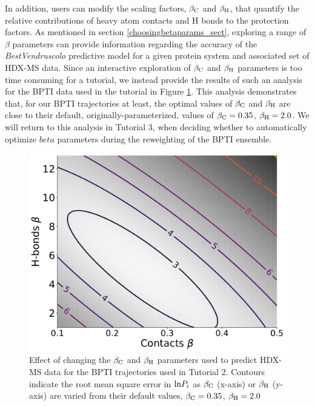 \documentclass[9pt,tutorial]{livecoms}
\begin{document}
In addition, users can modify the scaling factors, $\beta_\textnormal{C}$ and $\beta_\textnormal{H}$, that quantify the relative contributions of heavy atom contacts and H bonds to the protection factors.
As mentioned in section \ref{choosingbetaparams_sect}, exploring a range of $\beta$ parameters can provide information regarding the accuracy of the \textit{BestVendruscolo} predictive model for a given protein system and associated set of HDX-MS data.
Since an interactive exploration of $\beta_\textnormal{C}$ and $\beta_\textnormal{H}$ parameters is too time consuming for a tutorial, we instead provide the results of such an analysis for the BPTI data used in the tutorial in Figure \ref{fig:contourplot}.
This analysis demonstrates that, for our BPTI trajectories at least, the optimal values of $\beta_\textnormal{C}$ and $\beta_\textnormal{H}$ are close to their default, originally-parameterized, values of $\beta_\textnormal{C} = 0.35$, $\beta_\textnormal{H} = 2.0$.
We will return to this analysis in Tutorial 3, when deciding whether to automatically optimize $beta$ parameters during the reweighting of the BPTI ensemble.

\begin{figure}
    \includegraphics[width=0.98\linewidth]{Fig3_BPTI_noreweight_contour_plot_v2.pdf}
    \caption{Effect of changing the $\beta_\textnormal{C}$ and $\beta_\textnormal{H}$ parameters used to predict HDX-MS data for the BPTI trajectories used in Tutorial 2. Contours indicate the root mean square error in $\textnormal{ln}{P_i}$ as $\beta_\textnormal{C}$ (x-axis) or $\beta_\textnormal{H}$ (y-axis) are varied from their default values, $\beta_\textnormal{C} = 0.35$, $\beta_\textnormal{H} = 2.0$}
    \label{fig:contourplot}
\end{figure}
\end{document}
